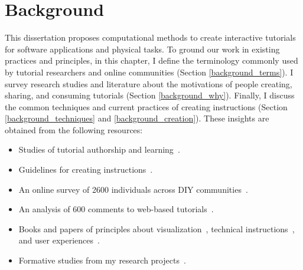 
\chapter{Background}
\label{chapter_background}

This dissertation proposes computational methods to create interactive tutorials for software applications and physical tasks. To ground our work in existing practices and principles, in this chapter, I define the terminology commonly used by tutorial researchers and online communities (Section \ref{background_terms}).
%
I survey research studies and literature about the motivations of people creating, sharing, and consuming tutorials (Section \ref{background_why}). Finally, I discuss the common techniques and current practices of creating instructions (Section \ref{background_techniques} and \ref{background_creation}).
%
These insights are obtained from the following resources:
\begin{itemize}
  \item Studies of tutorial authorship and learning~\cite{Torrey:2007he,Torrey:2009fc,Wakkary:2015:TAH:2702123.2702550,Black:1986:KMI:29933.275623,Tseng:2014:PVP:2598510.2598540}.
  \item Guidelines for creating instructions~\cite{InstructableHowTo,wikiHowHowTo}.
  \item An online survey of 2600 individuals across DIY communities~\cite{Kuznetsov:2010:REA:1868914.1868950}.
  \item An analysis of 600 comments to web-based tutorials~\cite{BenLafreniere:2013ux}.
  \item Books and papers of principles about visualization~\cite{tufte1990envisioning,Agrawala:2011:DPV:1924421.1924439}, technical instructions~\cite{mijksenaar1999open,Smith03iimanufacturer}, and user experiences~\cite{greenberg2012sketching,Buxton:2007:SUE:1526229}.
  \item Formative studies from my research projects~\cite{Chi:2012:MAG:2380116.2380130,Chi:2014:DRS:2556288.2557254,Chi:2013:DGC:2501988.2502052,Chi:2016:DemoDraw}.
\end{itemize}

